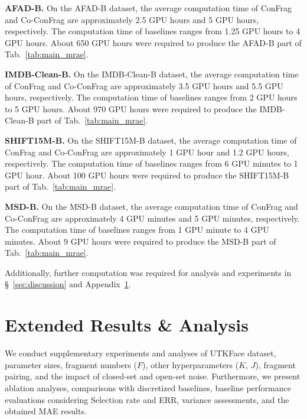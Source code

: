 \documentclass{article}
\theoremstyle{plain}
\theoremstyle{definition}
\theoremstyle{remark}
\begin{document}
\textbf{AFAD-B. }
On the AFAD-B dataset, the average computation time of ConFrag and Co-ConFrag are approximately 2.5 GPU hours and 5 GPU hours, respectively.
The computation time of baselines ranges from 1.25 GPU hours to 4 GPU hours.
About 650 GPU hours were required to produce the AFAD-B part of Tab.~\ref{tab:main_mrae}.


\textbf{IMDB-Clean-B. }
On the IMDB-Clean-B dataset, the average computation time of ConFrag and Co-ConFrag are approximately 3.5 GPU hours and 5.5 GPU hours, respectively.
The computation time of baselines ranges from 2 GPU hours to 5 GPU hours.
About 970 GPU hours were required to produce the IMDB-Clean-B part of Tab.~\ref{tab:main_mrae}.

\textbf{SHIFT15M-B. }
On the SHIFT15M-B dataset, the average computation time of ConFrag and Co-ConFrag are approximately 1 GPU hour and 1.2 GPU hours, respectively.
The computation time of baselines ranges from 6 GPU minutes to 1 GPU hour.
About 100 GPU hours were required to produce the SHIFT15M-B part of Tab.~\ref{tab:main_mrae}.


\textbf{MSD-B. }
On the MSD-B dataset, the average computation time of ConFrag and Co-ConFrag are approximately 4 GPU minutes and 5 GPU minutes, respectively.
The computation time of baselines ranges from 1 GPU minute to 4 GPU minutes.
About 9 GPU hours were required to produce the MSD-B part of Tab.~\ref{tab:main_mrae}.

Additionally, further computation was required for analysis and experiments in \S~\ref{sec:discussion} and Appendix~\ref{sec:results_analysis}.


\section{Extended Results \& Analysis}\label{sec:results_analysis}
We conduct supplementary experiments and analyses of UTKFace dataset, parameter sizes, fragment numbers ($F$), other hyperparameters ($K$, $J$), fragment pairing, and the impact of closed-set and open-set noise.
Furthermore, we present ablation analyses, comparisons with discretized baselines, baseline performance evaluations considering Selection rate and ERR, variance assessments,
and the obtained MAE results.
\end{document}
